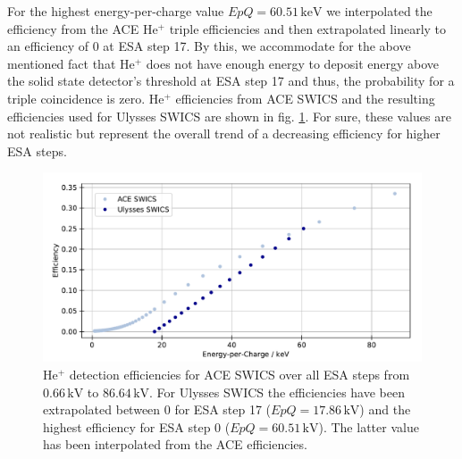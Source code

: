 For the highest energy-per-charge value $EpQ = 60.51\,\mathrm{keV}$ we interpolated the efficiency from the ACE $\mathrm{He^{+}}$ triple efficiencies and then extrapolated linearly to an efficiency of 0 at ESA step 17. By this, we accommodate for the above mentioned fact that $\mathrm{He^{+}}$ does not have enough energy to deposit energy above the solid state detector's threshold at ESA step 17 and thus, the probability for a triple coincidence is zero. $\mathrm{He^{+}}$ efficiencies from ACE SWICS and the resulting efficiencies used for Ulysses SWICS are shown in fig. \ref{fig:guess_eff}. For sure, these values are not realistic but represent the overall trend of a decreasing efficiency for higher ESA steps.
\begin{figure}[h]
	\includegraphics[width=1.\textwidth]{Figures/guess_eff.pdf}
	\centering
	\caption{$\mathrm{He^{+}}$ detection efficiencies for ACE SWICS over all ESA steps from $0.66\,\mathrm{kV}$ to $86.64\,\mathrm{kV}$. For Ulysses SWICS the efficiencies have been extrapolated between 0 for ESA step 17 ($EpQ = 17.86\,\mathrm{kV}$) and the highest efficiency for ESA step 0 ($EpQ =60.51\,\mathrm{kV}$). The latter value has been interpolated from the ACE efficiencies.}
	\label{fig:guess_eff}
\end{figure}


